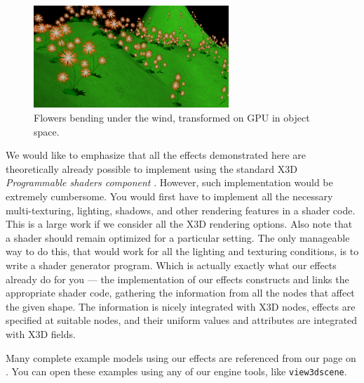 \documentclass{egpubl}
\begin{document}
\setcounter{figure}{8}
\begin{figure}[H]
  \centering
  \includegraphics[width=2.9in]{flowers-cropped}
  \caption{Flowers bending under the wind, transformed on GPU in object space.}
  \label{fig_flowers}
\end{figure}

We would like to emphasize that all the effects demonstrated here
are theoretically already possible to implement using the standard
X3D \textit{Programmable shaders component} \cite{x3d:shaders}. However, such implementation
would be extremely cumbersome.
You would first have to implement all the necessary multi-texturing, lighting,
shadows, and other rendering features in a shader code.
This is a large work if we consider all the X3D rendering options.
Also note that a shader should remain optimized for a particular setting.
The only manageable way to do this, that would work for all the lighting
and texturing conditions, is to write a shader generator program.
Which is actually exactly what our effects already do for you ---
the implementation of our effects constructs and links
the appropriate shader code, gathering the information from all the nodes
that affect the given shape. The information is nicely integrated
with X3D nodes, effects are specified at suitable nodes, and their
uniform values and attributes are integrated with X3D fields.

Many complete example models using our effects
are referenced from our page on
.
You can open these examples using any of our engine tools,
like \texttt{view3dscene}.

\end{document}
